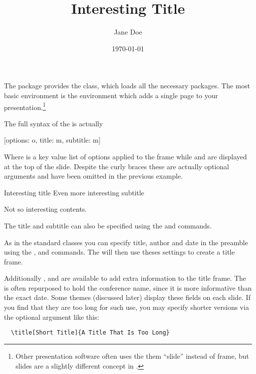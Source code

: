 The  package provides the  class, which loads all the
necessary packages. The most basic environment is the  environment
which adds a single page to your presentation.\footnote{Other presentation
  software often uses the them \enquote{slide} instead of frame, but slides are
  a slightly different concept in .}
The full syntax of the  is actually
\begin{lscommand}
  [options: o, title: m, subtitle: m]
\end{lscommand}
Where  is a key value list of options applied to the frame while
 and  are displayed at the top of the slide. Despite
the curly braces these are actually optional arguments and have been
omitted in the previous example.
\begin{example}
\begin{frame}{%
  Interesting title}{%
  Even more interesting
  subtitle}
  
  Not so interesting contents.
\end{frame}
\end{example}
The title and subtitle can also be specified using the  and
 commands.

As in the standard classes you can specify title, author and date in the preamble
using the ,  and  commands. The
 will then use theses settings to create a title frame.
\begin{example}
\author{Jane Doe}
\title{Interesting Title}
\date{\today}

\maketitle
\end{example}
Additionally ,  and  are
available to add extra information to the title frame. The  is often repurposed to hold
the conference name, since it is more informative than the exact date. Some
themes (discussed later) display these fields on each slide. If you find that
they are too long for such use, you may specify shorter versions via the optional
argument like this:
\begin{verbatim}
  \title[Short Title]{A Title That Is Too Long}
\end{verbatim}

